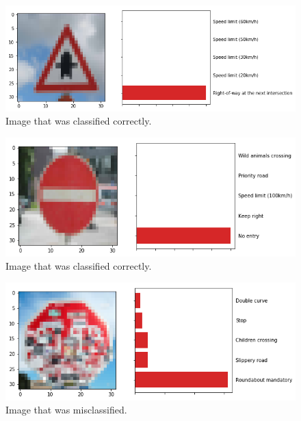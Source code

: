 \documentclass[12pt,twoside]{article}
\begin{document}
\begin{figure}[H]
	\begin{center}
		\includegraphics[width = 1.0\hsize]{./figures/Web2.png} 
		\caption{Image that was classified correctly.} %
		\label{fig:correct_classification} %
	\end{center}
\end{figure}


\begin{figure}[H]
	\begin{center}
		\includegraphics[width = 1.0\hsize]{./figures/Web3.png} 
		\caption{Image that was classified correctly.} %
		\label{fig:correct_classification} %
	\end{center}
\end{figure}



\begin{figure}[H]
	\begin{center}
		\includegraphics[width = 1.0\hsize]{./figures/Web4.png} 
		\caption{Image that was misclassified.} %
		\label{fig:vandalized_sign} %
	\end{center}
\end{figure}
\end{document}
